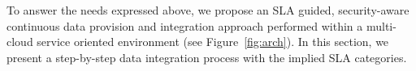 To answer the needs expressed above, we propose an SLA guided, security-aware continuous data provision and integration approach performed within a multi-cloud service oriented environment  (see
Figure~\ref{fig:arch}). In this section, we present  a step-by-step data integration process with the implied  SLA categories.




\begin{figure}
\end{figure}


